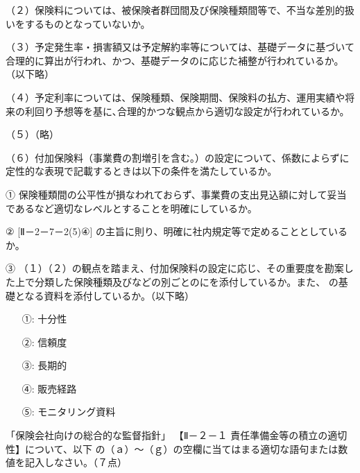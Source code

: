 \documentclass[report,gutter=10mm,fore-edge=10mm,uplatex,dvipdfmx]{jlreq}
\begin{document}
（２）保険料については、被保険者群団間及び保険種類間等で、不当な差別的扱いをするものとなっていないか。

（３）予定発生率・損害額又は予定解約率等については、基礎データに基づいて合理的に算出が行われ、かつ、基礎データのに応じた補整が行われているか。（以下略）

（４）予定利率については、保険種類、保険期間、保険料の払方、運用実績や将来の利回り予想等を基に､合理的かつな観点から適切な設定が行われているか。

（５）（略）

（６）付加保険料（事業費の割増引を含む｡）の設定について、係数によらずに定性的な表現で記載するときは以下の条件を満たしているか。

① 保険種類間の公平性が損なわれておらず、事業費の支出見込額に対して妥当であるなど適切なレベルとすることを明確にしているか。

② [Ⅱ－2－7－2(5)④] の主旨に則り、明確に社内規定等で定めることとしているか。

③ （１）（２）の観点を踏まえ、付加保険料の設定に応じ、その重要度を勘案した上で分類した保険種類及びなどの別ごとのにを添付しているか。また、 の基礎となる資料を添付しているか。（以下略）

\answer{}
\begin{itemize}
\item[ ①:] 十分性
\item[ ②:] 信頼度
\item[ ③:] 長期的
\item[ ④:] 販売経路
\item[ ⑤:] モニタリング資料
\end{itemize}


「保険会社向けの総合的な監督指針」
【Ⅱ－２－１ 責任準備金等の積立の適切性】について、以下
の（ａ）～（ｇ）の空欄に当てはまる適切な語句または数値を記入しなさい。（７点）
\end{document}
